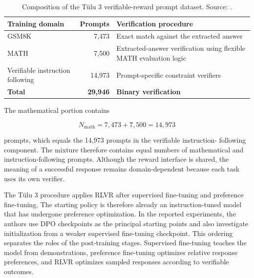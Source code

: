 \begin{table}[htbp]
    \centering
    \caption{Composition of the Tülu 3 verifiable-reward prompt dataset.
    Source: \textcite{lambert2025tulu3}.}
    \label{tab:rlvr-dataset-composition}
    \begin{tabularx}{\textwidth}{l r X}
        \toprule
        \textbf{Training domain}
        & \textbf{Prompts}
        & \textbf{Verification procedure}\\
        \midrule
        GSM8K
        & 7,473
        & Exact match against the extracted answer\\
        MATH
        & 7,500
        & Extracted-answer verification using flexible MATH evaluation logic\\
        Verifiable instruction following
        & 14,973
        & Prompt-specific constraint verifiers\\
        \midrule
        \textbf{Total}
        & \textbf{29,946}
        & \textbf{Binary verification}\\
        \bottomrule
    \end{tabularx}
\end{table}

The mathematical portion contains

\begin{equation}
    N_{\mathrm{math}}
    =
    7{,}473+7{,}500
    =
    14{,}973
    \label{eq:rlvr-math-count}
\end{equation}

prompts, which equals the 14,973 prompts in the verifiable instruction-
following component. The mixture therefore contains equal numbers of
mathematical and instruction-following prompts. Although the reward
interface is shared, the meaning of a successful response remains
domain-dependent because each task uses its own verifier.

The Tülu 3 procedure applies RLVR after supervised fine-tuning and
preference fine-tuning. The starting policy is therefore already an
instruction-tuned model that has undergone preference optimization. In
the reported experiments, the authors use DPO checkpoints as the principal
starting points and also investigate initialization from a weaker
supervised fine-tuning checkpoint. This ordering separates the roles of the
post-training stages. Supervised fine-tuning teaches the model from
demonstrations, preference fine-tuning optimizes relative response
preferences, and RLVR optimizes sampled responses according to verifiable
outcomes.

